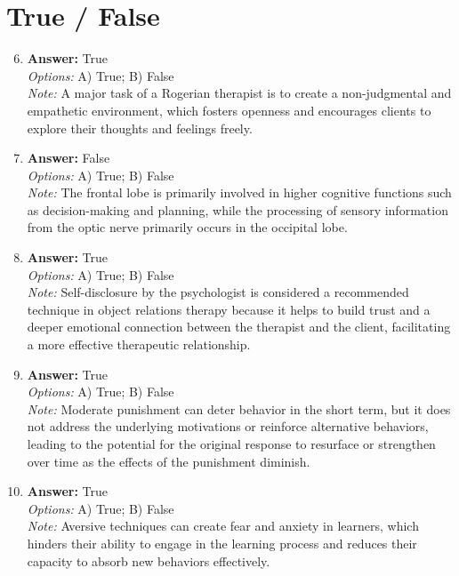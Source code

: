 \documentclass[12pt]{article}
\begin{document}
\section*{True / False}
\begin{enumerate}[label=\arabic*.]
\setcounter{enumi}{5}
\item \textbf{Answer:} True
\\ \textit{Options:} A) True; B) False
\\ \textit{Note:} A major task of a Rogerian therapist is to create a non-judgmental and empathetic environment, which fosters openness and encourages clients to explore their thoughts and feelings freely.
\item \textbf{Answer:} False
\\ \textit{Options:} A) True; B) False
\\ \textit{Note:} The frontal lobe is primarily involved in higher cognitive functions such as decision-making and planning, while the processing of sensory information from the optic nerve primarily occurs in the occipital lobe.
\item \textbf{Answer:} True
\\ \textit{Options:} A) True; B) False
\\ \textit{Note:} Self-disclosure by the psychologist is considered a recommended technique in object relations therapy because it helps to build trust and a deeper emotional connection between the therapist and the client, facilitating a more effective therapeutic relationship.
\item \textbf{Answer:} True
\\ \textit{Options:} A) True; B) False
\\ \textit{Note:} Moderate punishment can deter behavior in the short term, but it does not address the underlying motivations or reinforce alternative behaviors, leading to the potential for the original response to resurface or strengthen over time as the effects of the punishment diminish.
\item \textbf{Answer:} True
\\ \textit{Options:} A) True; B) False
\\ \textit{Note:} Aversive techniques can create fear and anxiety in learners, which hinders their ability to engage in the learning process and reduces their capacity to absorb new behaviors effectively.
\end{enumerate}
\end{document}
